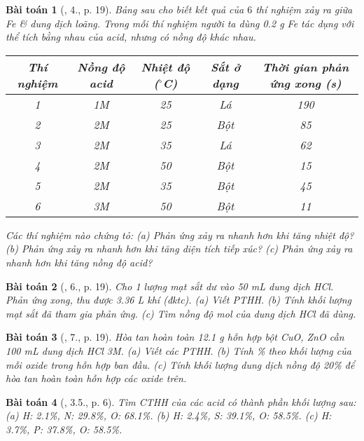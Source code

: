 \documentclass{article}
\newtheorem{baitoan}{Bài toán}
\begin{document}
\begin{baitoan}[\cite{SGK_Hoa_Hoc_9}, 4., p. 19]
	Bảng sau cho biết kết quả của $6$ thí nghiệm xảy ra giữa \emph{Fe} \& dung dịch \emph{} loãng. Trong mỗi thí nghiệm người ta dùng \emph{0.2 g Fe} tác dụng với thể tích bằng nhau của acid, nhưng có nồng độ khác nhau.
	\begin{table}[H]
		\centering
		\begin{tabular}{|c|c|c|c|c|}
			\hline
			Thí nghiệm & Nồng độ acid & Nhiệt độ (${}^\circ$C) & Sắt ở dạng & Thời gian phản ứng xong (s) \\
			\hline
			1 & 1M & 25 & Lá & 190 \\
			\hline
			2 & 2M & 25 & Bột & 85 \\
			\hline
			3 & 2M & 35 & Lá & 62 \\
			\hline
			4 & 2M & 50 & Bột & 15 \\
			\hline
			5 & 2M & 35 & Bột & 45 \\
			\hline
			6 & 3M & 50 & Bột & 11 \\
			\hline
		\end{tabular}
	\end{table}
	\noindent Các thí nghiệm nào chứng tỏ: (a) Phản ứng xảy ra nhanh hơn khi tăng nhiệt độ? (b) Phản ứng xảy ra nhanh hơn khi tăng diện tích tiếp xúc? (c) Phản ứng xảy ra nhanh hơn khi tăng nồng độ acid?
\end{baitoan}

\begin{baitoan}[\cite{SGK_Hoa_Hoc_9}, 6., p. 19]
	Cho 1 lượng mạt sắt dư vào \emph{50 mL} dung dịch \emph{HCl}. Phản ứng xong, thu được \emph{3.36 L} khí (đktc). (a) Viết PTHH. (b) Tính khối lượng mạt sắt đã tham gia phản ứng. (c) Tìm nồng độ mol của dung dịch \emph{HCl} đã dùng.
\end{baitoan}

\begin{baitoan}[\cite{SGK_Hoa_Hoc_9}, 7., p. 19]
	Hòa tan hoàn toàn \emph{12.1 g} hỗn hợp bột \emph{CuO, ZnO} cần \emph{100 mL} dung dịch \emph{HCl 3M}. (a) Viết các PTHH. (b) Tính \% theo khối lượng của mỗi oxide trong hỗn hợp ban đầu. (c) Tính khối lượng dung dịch \emph{} nồng độ \emph{20\%} để hòa tan hoàn toàn hỗn hợp các oxide trên.
\end{baitoan}

\begin{baitoan}[\cite{SBT_Hoa_Hoc_9}, 3.5., p. 6]
	Tìm CTHH của các acid có thành phần khối lượng sau: (a) \emph{H: 2.1\%, N: 29.8\%, O: 68.1\%}. (b) \emph{H: 2.4\%, S: 39.1\%, O: 58.5\%}. (c) \emph{H: 3.7\%, P: 37.8\%, O: 58.5\%}.
\end{baitoan}
\end{document}
